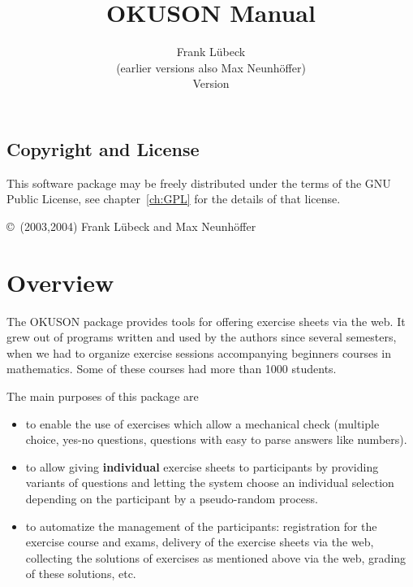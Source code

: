 \documentclass[12pt,openany,a4paper]{book}
\newcommand{\OKUSON}{\textsf{OKUSON}}
\begin{document}
\title{\Huge \textbf {\OKUSON} Manual}
\author{Frank Lübeck\\(earlier versions also Max Neunhöffer)
\\[2cm] Version }
\maketitle
\tableofcontents

\chapter*{}
\section*{Copyright and License}

This software package may be freely distributed under the terms of the
GNU Public License, see chapter~\ref{ch:GPL} for the details of that
license.

\copyright\  (2003,2004) Frank Lübeck and Max Neunhöffer


\chapter{Overview}

The {\OKUSON} package provides tools for offering exercise sheets via the
web. It grew out of programs written and used by the authors since several
semesters, when we had to organize exercise sessions accompanying beginners
courses in mathematics. Some of these courses had more than 1000 students.

The main purposes of this package are
\begin{itemize}
\item to enable the use of exercises which allow a mechanical check (multiple 
choice, yes-no questions, questions with easy to parse answers like numbers).
\item to allow giving \textbf{individual} exercise sheets to participants
by providing variants of questions and letting the system choose an
individual selection depending on the participant by a pseudo-random
process.
\item to automatize the management of the participants: registration for the
exercise course and exams, delivery of the exercise sheets via the web, 
collecting the  solutions of exercises as mentioned above via the web,
grading of these solutions, etc.
\end{itemize}
\end{document}
